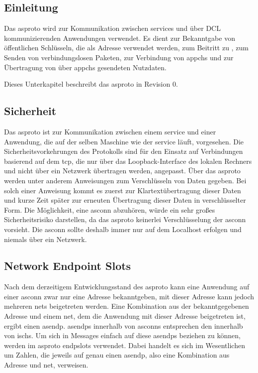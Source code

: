
\subsection{Einleitung}
Das \gls{asproto} wird zur Kommunikation zwischen \glspl{service} und über DCL
kommunizierenden Anwendungen verwendet. Es dient zur Bekanntgabe von
öffentlichen Schlüsseln, die als Adresse verwendet werden, zum Beitritt zu
, zum Senden von verbindungslosen Paketen, zur
Verbindung von \glspl{appch} und zur Übertragung von über \glspl{appch}
gesendeten Nutzdaten.

Dieses Unterkapitel beschreibt das \gls{asproto} in Revision 0.

\subsection{Sicherheit}
Das \gls{asproto} ist zur Kommunikation zwischen einem \gls{service} und einer
Anwendung, die auf der selben Maschine wie der \gls{service} läuft, vorgesehen.
Die Sicherheitsvorkehrungen des Protokolls sind für den Einsatz auf
Verbindungen basierend auf dem \acrfull{tcp}, die nur über das
Loopback-Interface des lokalen Rechners und nicht über ein Netzwerk übertragen
werden, angepasst.
Über das \gls{asproto} werden unter anderem Anweisungen zum Verschlüsseln von
Daten gegeben.
Bei solch einer Anweisung kommt es zuerst zur Klartextübertragung dieser Daten
und kurze Zeit später zur erneuten Übertragung dieser Daten in verschlüsselter
Form.
Die Möglichkeit, eine \gls{asconn} abzuhören, würde ein sehr großes
Sicherheitsrisiko darstellen, da das \gls{asproto} keinerlei Verschlüsselung
der \gls{asconn} vorsieht.
Die \gls{asconn} sollte deshalb immer nur auf dem Localhost erfolgen und niemals
über ein Netzwerk.

\subsection{Network Endpoint Slots}
Nach dem derzeitigem Entwicklungsstand des \gls{asproto} kann eine Anwendung
auf einer \gls{asconn} zwar nur eine Adresse bekanntgeben, mit dieser Adresse
kann jedoch mehreren \glspl{net} beigetreten werden.
Eine Kombination aus der bekanntgegebenen Adresse und einem \gls{net}, dem die
Anwendung mit dieser Adresse beigetreten ist, ergibt einen \gls{asendp}.
\glspl{asendp} innerhalb von \glspl{asconn} entsprechen den
 innerhalb von \glspl{isch}.
Um sich in Messages einfach auf diese \glspl{asendp} beziehen zu können, werden
im \gls{asproto} \glspl{endpslot} verwendet. Dabei handelt es sich im
Wesentlichen um Zahlen, die jeweils auf genau einen \gls{asendp}, also eine
Kombination aus Adresse und \gls{net}, verweisen.

